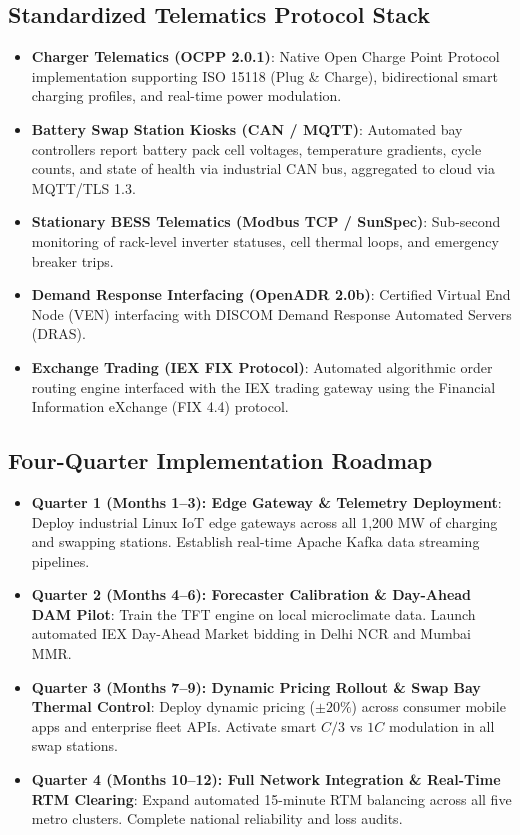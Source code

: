 \documentclass[10.5pt,a4paper]{article}
\begin{document}
\subsection{Standardized Telematics Protocol Stack}
\begin{itemize}[noitemsep]
    \item \textbf{Charger Telematics (OCPP 2.0.1)}: Native Open Charge Point Protocol implementation supporting ISO 15118 (Plug \& Charge), bidirectional smart charging profiles, and real-time power modulation.
    \item \textbf{Battery Swap Station Kiosks (CAN / MQTT)}: Automated bay controllers report battery pack cell voltages, temperature gradients, cycle counts, and state of health via industrial CAN bus, aggregated to cloud via MQTT/TLS 1.3.
    \item \textbf{Stationary BESS Telematics (Modbus TCP / SunSpec)}: Sub-second monitoring of rack-level inverter statuses, cell thermal loops, and emergency breaker trips.
    \item \textbf{Demand Response Interfacing (OpenADR 2.0b)}: Certified Virtual End Node (VEN) interfacing with DISCOM Demand Response Automated Servers (DRAS).
    \item \textbf{Exchange Trading (IEX FIX Protocol)}: Automated algorithmic order routing engine interfaced with the IEX trading gateway using the Financial Information eXchange (FIX 4.4) protocol.
\end{itemize}

\subsection{Four-Quarter Implementation Roadmap}
\begin{itemize}[noitemsep]
    \item \textbf{Quarter 1 (Months 1--3): Edge Gateway \& Telemetry Deployment}: Deploy industrial Linux IoT edge gateways across all 1,200 MW of charging and swapping stations. Establish real-time Apache Kafka data streaming pipelines.
    \item \textbf{Quarter 2 (Months 4--6): Forecaster Calibration \& Day-Ahead DAM Pilot}: Train the TFT engine on local microclimate data. Launch automated IEX Day-Ahead Market bidding in Delhi NCR and Mumbai MMR.
    \item \textbf{Quarter 3 (Months 7--9): Dynamic Pricing Rollout \& Swap Bay Thermal Control}: Deploy dynamic pricing ($\pm 20\%$) across consumer mobile apps and enterprise fleet APIs. Activate smart $C/3$ vs $1C$ modulation in all swap stations.
    \item \textbf{Quarter 4 (Months 10--12): Full Network Integration \& Real-Time RTM Clearing}: Expand automated 15-minute RTM balancing across all five metro clusters. Complete national reliability and loss audits.
\end{itemize}
\end{document}
